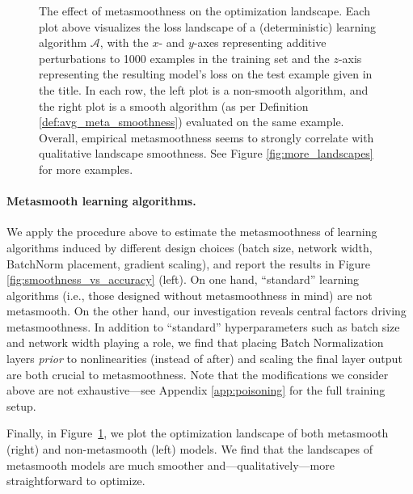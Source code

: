 \begin{figure}[h]
  \centering
  \newcommand{\plotnumber}{34}
  \newcommand{\zmin}{0}
  \newcommand{\zmax}{12.5}
  \newcommand{\zdist}{3}
  

  \vspace{.25cm} %

  \renewcommand{\plotnumber}{811}
  \renewcommand{\zmin}{-1}
  \renewcommand{\zmax}{3}
  \renewcommand{\zdist}{1}
  
  \caption{
    The effect of metasmoothness on the optimization landscape.
    Each plot above visualizes the loss landscape of a (deterministic)
    learning algorithm $\mathcal{A}$, with the $x$- and $y$-axes representing
    additive perturbations to 1000 examples in the training set
    and the $z$-axis representing the resulting model's loss
    on the test example given in the title.
    In each row, the left plot is a non-smooth algorithm,
    and the right plot is a smooth algorithm
    (as per Definition \ref{def:avg_meta_smoothness})
    evaluated on the same  example.
    Overall, empirical metasmoothness seems to strongly correlate with
    qualitative landscape smoothness. See Figure \ref{fig:more_landscapes}
    for more examples.
  }
  \label{fig:smoothness_3d}
\end{figure}

\paragraph{Metasmooth learning algorithms.}
We apply the procedure above to estimate the metasmoothness of learning
algorithms induced by different design choices
(batch size, network width, BatchNorm placement, gradient scaling),
and report the results in Figure \ref{fig:smoothness_vs_accuracy}
(left). On one hand,
``standard'' learning algorithms (i.e., those designed without metasmoothness in
mind) are not metasmooth.
On the other hand, our investigation reveals central factors driving
metasmoothness.
In addition to ``standard''
hyperparameters such as batch size and network width playing a role, we find
that placing Batch Normalization layers {\em prior} to nonlinearities (instead
of after) and scaling the final layer output are both crucial to metasmoothness.
Note that the modifications we consider above are not exhaustive---see
Appendix \ref{app:poisoning} for the full training setup.

Finally, in Figure~\ref{fig:smoothness_3d}, we plot
the optimization landscape of both metasmooth (right) and
non-metasmooth (left) models.
We find that the landscapes of metasmooth models are much smoother
and---qualitatively---more straightforward to optimize.

